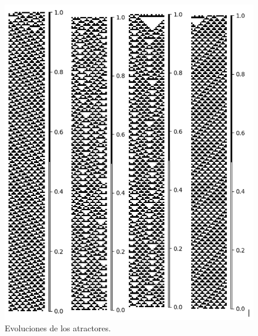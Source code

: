 \documentclass[11pt]{article}
\begin{document}
			\begin{figure}[H]
			\centering
			\includegraphics[scale=0.3]{resources/Atractores54/atractor_54_size_24_res.png}
			\caption{Evoluciones de los atractores.}\label{fig:picture}
			\end{figure}
\end{document}
